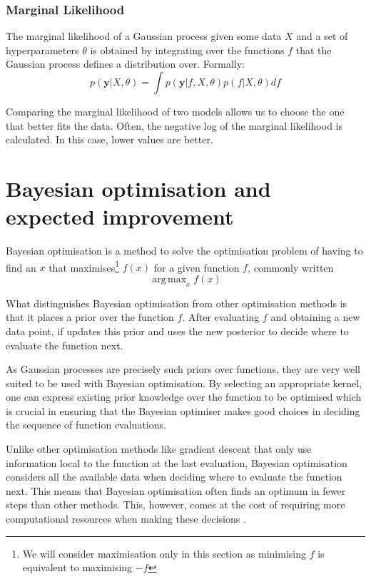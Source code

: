 \documentclass[a4paper,12pt,twoside,openright]{report}
\DeclareMathOperator*{\argmax}{arg\,max}
\begin{document}

\subsubsection{Marginal Likelihood}
The marginal likelihood of a Gaussian process given some data $X$ and a set of hyperparameters $\theta$ is obtained by integrating over the functions $f$ that the Gaussian process defines a distribution over. Formally:
\begin{equation}
p(\mathbf{y}|X, \theta) = \int p(\mathbf{y}|f, X, \theta)p(f|X, \theta) df
\end{equation}

Comparing the marginal likelihood of two models allows us to choose the one that better fits the data. Often, the negative log of the marginal likelihood is calculated. In this case, lower values are better.


\section{Bayesian optimisation and expected improvement}

Bayesian optimisation is a method to solve the optimisation problem of having to find an $x$ that maximises\footnote{We will consider maximisation only in this section as minimising $f$ is equivalent to maximising $-f$} $f(x)$ for a given function $f$, commonly written 
\begin{equation}
\argmax_x f(x)
\end{equation}

What distinguishes Bayesian optimisation from other optimisation methods is that it places a prior over the function $f$. After evaluating $f$ and obtaining a new data point, if updates this prior and uses the new posterior to decide where to evaluate the function next.

As Gaussian processes are precisely such priors over functions, they are very well suited to be used with Bayesian optimisation. By selecting an appropriate kernel, one can express existing prior knowledge over the function to be optimised which is crucial in ensuring that the Bayesian optimiser makes good choices in deciding the sequence of function evaluations.

Unlike other optimisation methods like gradient descent that only use information local to the function at the last evaluation, Bayesian optimisation considers all the available data when deciding where to evaluate the function next. This means that Bayesian optimisation often finds an optimum in fewer steps than other methods. This, however, comes at the cost of requiring more computational resources when making these decisions \cite{PracticalBayesianOptimization}.
\end{document}

